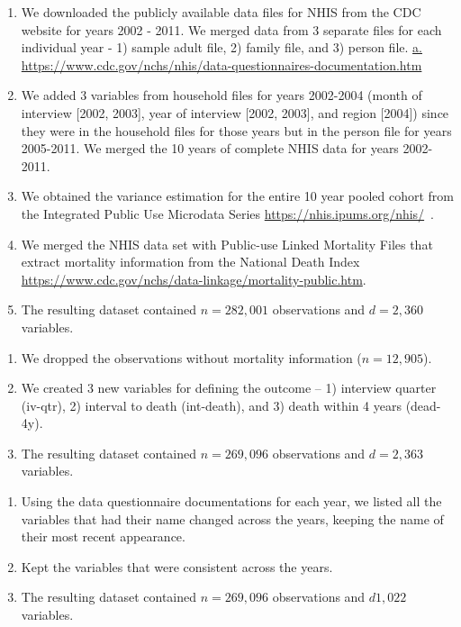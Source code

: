 \documentclass[reqno,11pt]{article}
\begin{document}
\begin{enumerate}
\item We downloaded the publicly available data files for NHIS from the CDC website for years 2002 - 2011. We merged data from 3 separate files for each individual year - 1) sample adult file, 2) family file, and 3) person file. \url{a.	https://www.cdc.gov/nchs/nhis/data-questionnaires-documentation.htm}
\item We added 3 variables from household files for years 2002-2004 (month of interview [2002, 2003], year of interview [2002, 2003], and region [2004]) since they were in the household files for those years but in the person file for years 2005-2011. We merged the 10 years of complete NHIS data for years 2002-2011.
\item We obtained the variance estimation for the entire 10 year pooled cohort from the Integrated Public Use Microdata Series \url{https://nhis.ipums.org/nhis/}~\citep{blewett2016ipums}.
\item We merged the NHIS data set with Public-use Linked Mortality Files that extract mortality information from the National Death Index \url{https://www.cdc.gov/nchs/data-linkage/mortality-public.htm}.
\item The resulting dataset contained $n=282,001$ observations and $d=2,360$ variables.
\end{enumerate}

\begin{enumerate}
\item We dropped the observations without mortality information ($n=12,905$). 
\item We created 3 new variables for defining the outcome – 1) interview quarter (iv-qtr), 2) interval to death (int-death), and 3) death within 4 years (dead-4y).
\item The resulting dataset contained $n=269,096$ observations and $d=2,363$ variables.
\end{enumerate}

\begin{enumerate}
\item  Using the data questionnaire documentations for each year, we listed all the variables that had their name changed across the years, keeping the name of their most recent appearance. 
\item Kept the variables that were consistent across the years.
\item  The resulting dataset contained $n=269,096$ observations and $d1,022$ variables.
\end{enumerate}
\end{document}
